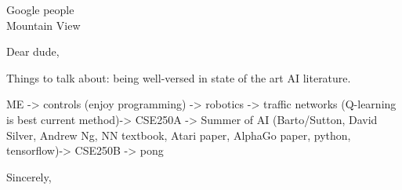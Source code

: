 \documentclass{letter}
\begin{document}
\begin{letter}{Google people \\ Mountain View}
\opening{Dear dude,}
Things to talk about: being well-versed in state of the art AI literature.

ME -> controls (enjoy programming) -> robotics -> traffic networks (Q-learning is best current method)-> CSE250A -> Summer of AI (Barto/Sutton, David Silver, Andrew Ng, NN textbook, Atari paper, AlphaGo paper, python, tensorflow)-> CSE250B -> pong
\closing{Sincerely,}
\end{letter}
\end{document}
